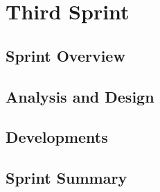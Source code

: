 \chapter{Third Sprint}\label{chap:sprint3}

\section{Sprint Overview}


\section{Analysis and Design}\label{sec:sprint3:analysis}




\section{Developments}\label{sec:sprint3:developments}




\section{Sprint Summary}
